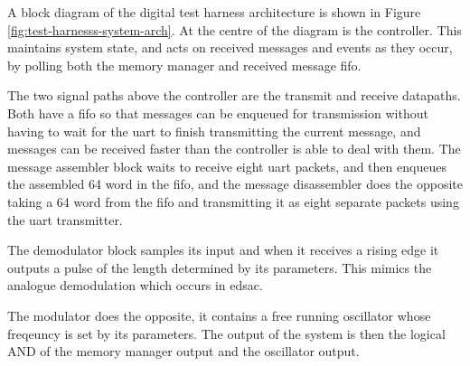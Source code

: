 A block diagram of the digital test harness architecture is shown in Figure \ref{fig:test-harnesss-system-arch}. At the centre of the diagram is the controller. This maintains system state, and acts on received messages and events as they occur, by polling both the memory manager and received message \gls{fifo}.

The two signal paths above the controller are the transmit and receive datapaths. Both have a \gls{fifo} so that messages can be enqueued for transmission without having to wait for the \gls{uart} to finish transmitting the current message, and messages can be received faster than the controller is able to deal with them. The message assembler block waits to receive eight \gls{uart} packets, and then enqueues the assembled \SI{64}{\bit} word in the \gls{fifo}, and the message disassembler does the opposite taking a \SI{64}{\bit} word from the \gls{fifo} and transmitting it as eight separate packets using the \gls{uart} transmitter.

The demodulator block samples its input and when it receives a rising edge it outputs a pulse of the length determined by its parameters. This mimics the analogue demodulation which occurs in \gls{edsac}.

The modulator does the opposite, it contains a free running oscillator whose freqeuncy is set by its parameters. The output of the system is then the logical AND of the memory manager output and the oscillator output.

